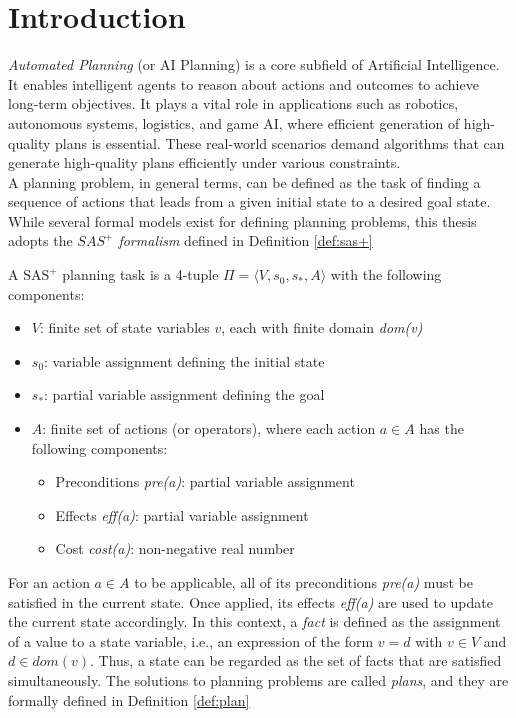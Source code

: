 \chapter{Introduction}
\label{ch:intro}
\textit{Automated Planning} (or AI Planning) is a core subfield of Artificial Intelligence.
It enables intelligent agents to reason about actions and outcomes to
achieve long-term objectives. It plays a vital role in applications such as robotics,
autonomous systems, logistics, and game AI, where efficient generation of high-quality plans is essential.
These real-world scenarios demand algorithms that can generate
high-quality plans efficiently under various constraints.\\
A planning problem, in general terms, can be defined as the task of finding a sequence
of actions that leads from a given initial state to a desired goal state.
While several formal models exist for defining planning problems, this thesis
adopts the \textit{$SAS^+$ formalism} defined in Definition \ref{def:sas+}

\begin{definition}
	\label{def:sas+}
	A $\text{SAS}^+$ planning task is a 4-tuple $\Pi = \langle V, s_0, s_*, A \rangle$ with
	the following components:
	\begin{itemize}
		\item \(V\): finite set of state variables \(v\),
		      each with finite domain \textit{dom(v)}
		\item \(s_0\): variable assignment defining the initial state
		\item \(s_*\): partial variable assignment defining the goal
		\item \(A\): finite set of actions (or operators),
		      where each action $a \in A$ has the following components:
		      \begin{itemize}
			      \item Preconditions \textit{pre(a)}: partial variable assignment
			      \item Effects \textit{eff(a)}: partial variable assignment
			      \item Cost \textit{cost(a)}: non-negative real number
		      \end{itemize}
	\end{itemize}
\end{definition}

For an action $a \in A$ to be applicable, all of its preconditions
\textit{pre(a)} must be satisfied in the current state. Once applied, its effects
\textit{eff(a)} are used to update the current state accordingly.
In this context, a \textit{fact} is defined as the assignment of a value to a state variable,
i.e., an expression of the form $v = d$ with $v \in V$ and $d \in dom(v)$.
Thus, a state can be regarded as the set of facts that are satisfied simultaneously.
The solutions to planning problems are called \textit{plans}, and they are formally defined in Definition \ref{def:plan}

